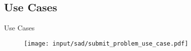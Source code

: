 \subsection{Use Cases}
\begin{frame}{Use Cases}

\begin{figure}[htbp]
	\begin{center}
	\texttt{[image: input/sad/submit\_problem\_use\_case.pdf]}
	\end{center}
\end{figure}

\end{frame}